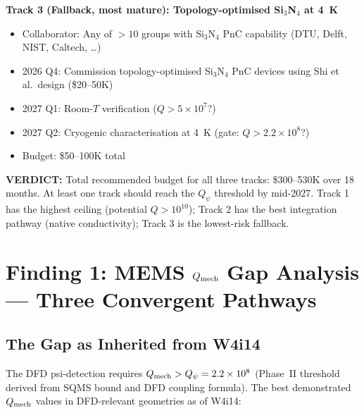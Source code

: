 \documentclass[11pt]{article}
\theoremstyle{definition}
\theoremstyle{remark}
\newcommand{\ee}[1]{\times 10^{#1}}
\newcommand{\Qpsi}{Q_\psi}
\newcommand{\Qmech}{Q_{\rm mech}}
\newcommand{\verdict}[1]{\textcolor{green!50!black}{\textbf{VERDICT:} #1}}
\begin{document}
\begin{tcolorbox}[colback=blue!5!white, colframe=blue!50!black,
  title=\textbf{W4i15 TOP 5 FINDINGS --- Ranked by Programme Impact}]
\begin{enumerate}
\textbf{Track 3 (Fallback, most mature):
Topology-optimised Si$_3$N$_4$ at 4~K}
\begin{itemize}[nosep]
\item Collaborator: Any of $> 10$ groups with Si$_3$N$_4$ PnC
  capability (DTU, Delft, NIST, Caltech, \ldots)
\item 2026 Q4: Commission topology-optimised Si$_3$N$_4$ PnC
  devices using Shi et al.\ design (\$20--50K)
\item 2027 Q1: Room-$T$ verification ($Q > 5\ee{7}$?)
\item 2027 Q2: Cryogenic characterisation at 4~K
  (gate: $Q > 2.2\ee{8}$?)
\item Budget: \$50--100K total
\end{itemize}

\verdict{Total recommended budget for all three tracks:
\$300--530K over 18 months. At least one track should reach the
$\Qpsi$ threshold by mid-2027. Track 1 has the highest ceiling
(potential $Q > 10^{10}$); Track 2 has the best integration
pathway (native conductivity); Track 3 is the lowest-risk
fallback.}

\end{enumerate}
\end{tcolorbox}


\section{Finding 1: MEMS $Q_{\rm mech}$ Gap Analysis --- Three Convergent Pathways}
\label{sec:gap_closure}

\subsection{The Gap as Inherited from W4i14}

The DFD psi-detection requires $\Qmech > \Qpsi = 2.2\ee{8}$
(Phase~II threshold derived from SQMS bound and DFD coupling
formula). The best demonstrated $\Qmech$ values in DFD-relevant
geometries as of W4i14:
\end{document}
